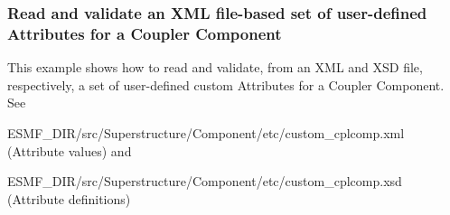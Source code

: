  
\setlength{\oldparskip}{\parskip}
\setlength{\parskip}{1.5ex}
\setlength{\oldparindent}{\parindent}
\setlength{\parindent}{0pt}
\setlength{\oldbaselineskip}{\baselineskip}
\setlength{\baselineskip}{11pt}
 
\def\bv{\begin{verbatim}}
\def\ev{\end{verbatim}}
\def\be{\begin{equation}}
\def\ee{\end{equation}}
\def\bea{\begin{eqnarray}}
\def\eea{\end{eqnarray}}
\def\bi{\begin{itemize}}
\def\ei{\end{itemize}}
\def\bn{\begin{enumerate}}
\def\en{\end{enumerate}}
\def\bd{\begin{description}}
\def\ed{\end{description}}
\def\({\left (}
\def\){\right )}
\def\[{\left [}
\def\]{\right ]}
\def\<{\left  \langle}
\def\>{\right \rangle}
\def\cI{{\cal I}}
\def\diag{\mathop{\rm diag}}
\def\tr{\mathop{\rm tr}}


 

   \subsubsection{Read and validate an XML file-based set of user-defined Attributes for a Coupler Component}
   This example shows how to read and validate, from an XML and XSD file,
   respectively, a set of user-defined custom Attributes for a Coupler Component.
   See
   \begin{description}
   \item ESMF\_DIR/src/Superstructure/Component/etc/custom\_cplcomp.xml (Attribute values) and 
   \item ESMF\_DIR/src/Superstructure/Component/etc/custom\_cplcomp.xsd (Attribute definitions)
   \end{description} 

